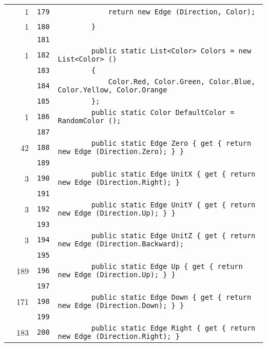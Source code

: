 \documentclass[a4paper,10pt]{article}
\begin{document}
\begin{longtable}[l]{lrrl}
\cellcolor{green} & 1 & \verb~179~ & \verb~            return new Edge (Direction, Color);~\\
\cellcolor{green} & 1 & \verb~180~ & \verb~        }~\\
\cellcolor{gray} &  & \verb~181~ & \verb~~\\
\cellcolor{green} & 1 & \verb~182~ & \verb~        public static List<Color> Colors = new List<Color> ()~\\
\cellcolor{gray} &  & \verb~183~ & \verb~        {~\\
\cellcolor{gray} &  & \verb~184~ & \verb~            Color.Red, Color.Green, Color.Blue, Color.Yellow, Color.Orange~\\
\cellcolor{gray} &  & \verb~185~ & \verb~        };~\\
\cellcolor{green} & 1 & \verb~186~ & \verb~        public static Color DefaultColor = RandomColor ();~\\
\cellcolor{gray} &  & \verb~187~ & \verb~~\\
\cellcolor{green} & 42 & \verb~188~ & \verb~        public static Edge Zero { get { return new Edge (Direction.Zero); } }~\\
\cellcolor{gray} &  & \verb~189~ & \verb~~\\
\cellcolor{green} & 3 & \verb~190~ & \verb~        public static Edge UnitX { get { return new Edge (Direction.Right); } ~\\
\cellcolor{gray} &  & \verb~191~ & \verb~~\\
\cellcolor{green} & 3 & \verb~192~ & \verb~        public static Edge UnitY { get { return new Edge (Direction.Up); } }~\\
\cellcolor{gray} &  & \verb~193~ & \verb~~\\
\cellcolor{green} & 3 & \verb~194~ & \verb~        public static Edge UnitZ { get { return new Edge (Direction.Backward);~\\
\cellcolor{gray} &  & \verb~195~ & \verb~~\\
\cellcolor{green} & 189 & \verb~196~ & \verb~        public static Edge Up { get { return new Edge (Direction.Up); } }~\\
\cellcolor{gray} &  & \verb~197~ & \verb~~\\
\cellcolor{green} & 171 & \verb~198~ & \verb~        public static Edge Down { get { return new Edge (Direction.Down); } }~\\
\cellcolor{gray} &  & \verb~199~ & \verb~~\\
\cellcolor{green} & 183 & \verb~200~ & \verb~        public static Edge Right { get { return new Edge (Direction.Right); } ~\\

\end{longtable}
\end{document}
